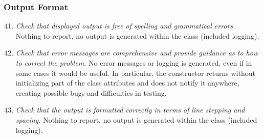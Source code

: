 	\subsubsection{Output Format}
		\begin{enumerate}
			\setcounter{enumi}{40}
			\item \textit{Check that displayed output is free of spelling and grammatical errors.}\newline
			Nothing to report, no output is generated within the class (included logging). %

			\item \textit{Check that error messages are comprehensive and provide guidance as to how to correct the problem.}\newline
			No error messages or logging is generated, even if in some cases it would be useful. In particular, the constructor returns without initializing part of the class attributes and does not notify it anywhere, creating possible bugs and difficulties in testing.

			\item \textit{Check that the output is formatted correctly in terms of line stepping and spacing.}\newline
			Nothing to report, no output is generated within the class (included logging). %
		\end{enumerate}

